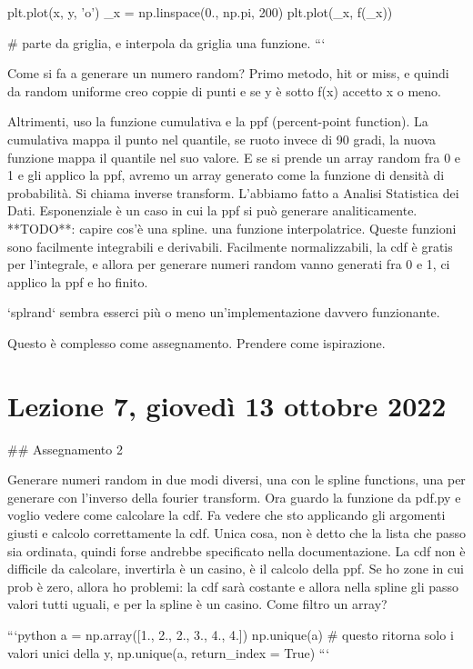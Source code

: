 \documentclass[10pt, a4paper, twosided, titlepage, draft]{book}
\begin{document}
plt.plot(x, y, 'o')
_x = np.linspace(0., np.pi, 200)
plt.plot(_x, f(_x))

# parte da griglia, e interpola da griglia una funzione.
```

Come si fa a generare un numero random? Primo metodo, hit or miss, e quindi da random uniforme creo coppie di punti e se y è sotto f(x) accetto x o meno.

Altrimenti, uso la funzione cumulativa e la ppf (percent-point function). La cumulativa mappa il punto nel quantile, se ruoto invece di 90 gradi, la nuova funzione mappa il quantile nel suo valore.
E se si prende un array random fra 0 e 1 e gli applico la ppf, avremo un array generato come la funzione di densità di probabilità. Si chiama inverse transform. L'abbiamo fatto a Analisi Statistica dei Dati. Esponenziale è un caso in cui la ppf si può generare analiticamente.
**TODO**: capire cos'è una spline. una funzione interpolatrice. Queste funzioni sono facilmente integrabili e derivabili. Facilmente normalizzabili, la cdf è gratis per l'integrale, e allora per generare numeri random vanno generati fra 0 e 1, ci applico la ppf e ho finito.

`splrand` sembra esserci più o meno un'implementazione davvero funzionante.

Questo è complesso come assegnamento. Prendere come ispirazione.


\section{Lezione 7, giovedì 13 ottobre 2022}

## Assegnamento 2

Generare numeri random in due modi diversi, una con le spline functions, una per generare con l'inverso della fourier transform.
Ora guardo la funzione da pdf.py e voglio vedere come calcolare la cdf. Fa vedere che sto applicando gli argomenti giusti e calcolo correttamente la cdf. 
Unica cosa, non è detto che la lista che passo sia ordinata, quindi forse andrebbe specificato nella documentazione.
La cdf non è difficile da calcolare, invertirla è un casino, è il calcolo della ppf.
Se ho zone in cui prob è zero, allora ho problemi: la cdf sarà costante e allora nella spline gli passo valori tutti uguali, e per la spline è un casino.
Come filtro un array?

```python
a = np.array([1., 2., 2., 3., 4., 4.])
np.unique(a)
# questo ritorna solo i valori unici della y, 
np.unique(a, return_index = True)
```
\end{document}
